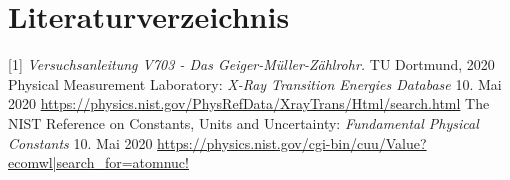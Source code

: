 \documentclass[titlepage = firstcover]{scrartcl}
\begin{document}
        \newpage
        \section{Literaturverzeichnis}
        [1] \textit{Versuchsanleitung V703 - Das Geiger-Müller-Zählrohr.} TU Dortmund, 2020 \newline
        [2] Physical Measurement Laboratory: \textit{X-Ray Transition Energies Database} 10. Mai 2020
        \url{https://physics.nist.gov/PhysRefData/XrayTrans/Html/search.html} \newline
        [3] The NIST Reference on Constants, Units and Uncertainty: \textit{Fundamental Physical Constants} 10. Mai 2020
        \url{https://physics.nist.gov/cgi-bin/cuu/Value?ecomwl|search_for=atomnuc!}
\end{document}
